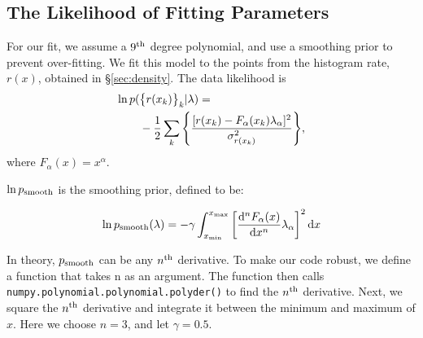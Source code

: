\subsection{The Likelihood of Fitting Parameters}
\label{subsec:likelihood}

For our fit, we assume a $9^{\rm th}$ degree polynomial, and use a smoothing prior to prevent over-fitting. We fit this model to the points from the histogram rate, $r(x)$, obtained in \S\ref{sec:density}. The data likelihood is
%
\begin{align}
  \ln p( &\qty{r(x_k)}_k | \lambda ) = \notag
  \\ &
 -\frac{1}{2}
  \sum_k
  \qty{\frac{[r(x_k) - F_\alpha(x_k) \lambda_\alpha]^2}{\sigma_{r(x_k)}^2}},
%
  \label{likelihood}
\end{align}
%
where $F_\alpha(x) = x^\alpha$.

$\ln p_{\rm smooth}$ is the smoothing prior, defined to be:

\begin{equation}
  \ln p_{\rm smooth}(\lambda) =
 -\gamma \int_{x_{\min}}^{x_{\max}}
  \qty[ \dv[n]{F_\alpha(x)}{x} \lambda_\alpha ]^2 \dd{x}
%
  \label{smoothing_prior}
\end{equation}

In theory, $p_{\rm smooth}$ can be any $n^{\rm th}$ derivative. To make our code robust, we define a function that takes n as an argument. The function then calls \texttt{numpy.polynomial.polynomial.polyder()} to find the $n^{\rm th}$ derivative. Next, we square the $n^{\rm th}$ derivative and integrate it between the minimum and maximum of $x$. Here we choose $n = 3$, and let $\gamma = 0.5$.  